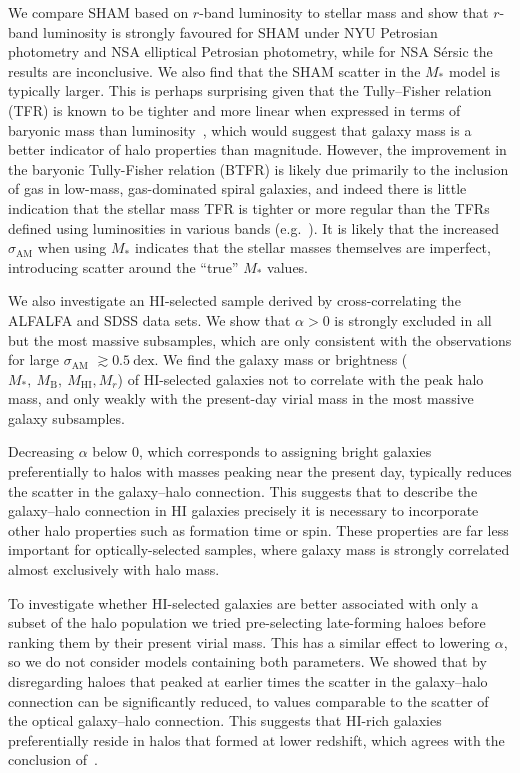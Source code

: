 \documentclass[usenatbib,useAMS]{mnras}
\newcommand{\HI}{\ensuremath{\mathrm{H}\scriptstyle\mathrm{I}}}
\newcommand{\scatter}{\ensuremath{\sigma_{\mathrm{AM}}}}
\begin{document}
We compare \ac{SHAM} based on $r$-band luminosity to stellar mass and show that $r$-band luminosity is strongly favoured for \ac{SHAM} under \ac{NYU} Petrosian photometry and \ac{NSA} elliptical Petrosian photometry, while for \ac{NSA} S\'ersic the results are inconclusive. We also find that the \ac{SHAM} scatter in the $M_*$ model is typically larger. This is perhaps surprising given that the Tully--Fisher relation (TFR) is known to be tighter and more linear when expressed in terms of baryonic mass than luminosity~\citep{McGaugh2000}, which would suggest that galaxy mass is a better indicator of halo properties than magnitude. However, the improvement in the baryonic Tully-Fisher relation (BTFR) is likely due primarily to the inclusion of gas in low-mass, gas-dominated spiral galaxies, and indeed there is little indication that the stellar mass TFR is tighter or more regular than the TFRs defined using luminosities in various bands (e.g.~\citealt{McGaugh_2005, McGaugh_2015}). It is likely that the increased $\scatter$ when using $M_*$ indicates that the stellar masses themselves are imperfect, introducing scatter around the ``true'' $M_*$ values.

We also investigate an $\HI$-selected sample derived by cross-correlating the ALFALFA and \ac{SDSS} data sets. We show that $\alpha > 0$ is strongly excluded in all but the most massive subsamples, which are only consistent with the observations for large $\scatter$ $\gtrsim 0.5~\mathrm{dex}$. We find the galaxy mass or brightness ($M_*,~M_\mathrm{B},~M_{\HI}, M_r$) of $\HI$-selected galaxies not to correlate with the peak halo mass, and only weakly with the present-day virial mass in the most massive galaxy subsamples.

Decreasing $\alpha$ below $0$, which corresponds to assigning bright galaxies preferentially to halos with masses peaking near the present day, typically reduces the scatter in the galaxy--halo connection. This suggests that to describe the galaxy--halo connection in $\HI$ galaxies precisely it is necessary to incorporate other halo properties such as formation time or spin. These properties are far less important for optically-selected samples, where galaxy mass is strongly correlated almost exclusively with halo mass.

To investigate whether $\HI$-selected galaxies are better associated with only a subset of the halo population we tried pre-selecting late-forming haloes before ranking them by their present virial mass. This has a similar effect to lowering $\alpha$, so we do not consider models containing both parameters. We showed that by disregarding haloes that peaked at earlier times the scatter in the galaxy--halo connection can be significantly reduced, to values comparable to the scatter of the optical galaxy--halo connection. This suggests that $\HI$-rich galaxies preferentially reside in halos that formed at lower redshift,
which agrees with the conclusion of~\citet{Guo}.
\end{document}
